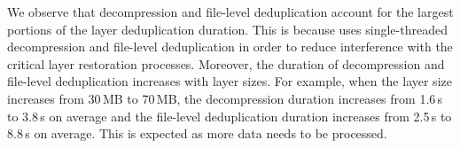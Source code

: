 We observe that decompression and file-level deduplication account for the largest portions of
the layer deduplication duration.
%
%
This is because \sysname uses single-threaded decompression and file-level deduplication in
order to reduce interference with the critical layer restoration processes.
%
%
Moreover, the duration of decompression and file-level deduplication increases with layer sizes.
%
For example, when the layer size increases from 30\,MB to 70\,MB, 
the decompression duration increases from 1.6\,s to 3.8\,s on average and the file-level deduplication duration increases from 2.5\,s to 8.8\,s on average.
%
This is expected as more data needs to be processed.


